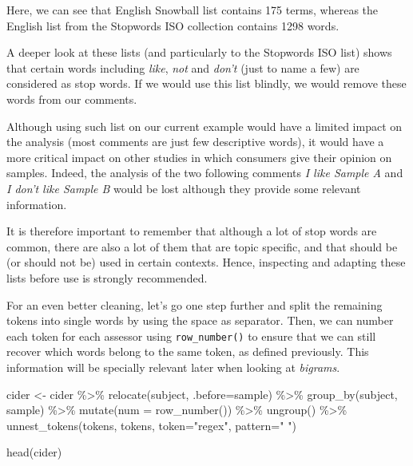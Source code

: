 \documentclass[
]{book}
\newenvironment{Shaded}{\begin{snugshade}}{\end{snugshade}}
\newcommand{\AttributeTok}[1]{\textcolor[rgb]{0.77,0.63,0.00}{#1}}
\newcommand{\FunctionTok}[1]{\textcolor[rgb]{0.00,0.00,0.00}{#1}}
\newcommand{\NormalTok}[1]{#1}
\newcommand{\OtherTok}[1]{\textcolor[rgb]{0.56,0.35,0.01}{#1}}
\newcommand{\SpecialCharTok}[1]{\textcolor[rgb]{0.00,0.00,0.00}{#1}}
\newcommand{\StringTok}[1]{\textcolor[rgb]{0.31,0.60,0.02}{#1}}
\begin{document}
Here, we can see that English Snowball list contains 175 terms, whereas the English list from the Stopwords ISO collection contains 1298 words.

A deeper look at these lists (and particularly to the Stopwords ISO list) shows that certain words including \emph{like}, \emph{not} and \emph{don't} (just to name a few) are considered as stop words. If we would use this list blindly, we would remove these words from our comments.

Although using such list on our current example would have a limited impact on the analysis (most comments are just few descriptive words), it would have a more critical impact on other studies in which consumers give their opinion on samples. Indeed, the analysis of the two following comments \emph{I like Sample A} and \emph{I don't like Sample B} would be lost although they provide some relevant information.

It is therefore important to remember that although a lot of stop words are common, there are also a lot of them that are topic specific, and that should be (or should not be) used in certain contexts. Hence, inspecting and adapting these lists before use is strongly recommended.

For an even better cleaning, let's go one step further and split the remaining tokens into single words by using the space as separator. Then, we can number each token for each assessor using \texttt{row\_number()} to ensure that we can still recover which words belong to the same token, as defined previously. This information will be specially relevant later when looking at \emph{bigrams}.

\begin{Shaded}
\begin{Highlighting}[]
\NormalTok{cider }\OtherTok{\textless{}{-}}\NormalTok{ cider }\SpecialCharTok{\%\textgreater{}\%} 
  \FunctionTok{relocate}\NormalTok{(subject, }\AttributeTok{.before=}\NormalTok{sample) }\SpecialCharTok{\%\textgreater{}\%} 
  \FunctionTok{group\_by}\NormalTok{(subject, sample) }\SpecialCharTok{\%\textgreater{}\%} 
  \FunctionTok{mutate}\NormalTok{(}\AttributeTok{num =} \FunctionTok{row\_number}\NormalTok{()) }\SpecialCharTok{\%\textgreater{}\%} 
  \FunctionTok{ungroup}\NormalTok{() }\SpecialCharTok{\%\textgreater{}\%} 
  \FunctionTok{unnest\_tokens}\NormalTok{(tokens, tokens, }\AttributeTok{token=}\StringTok{"regex"}\NormalTok{, }\AttributeTok{pattern=}\StringTok{" "}\NormalTok{)}

\FunctionTok{head}\NormalTok{(cider)}
\end{Highlighting}
\end{Shaded}
\end{document}

